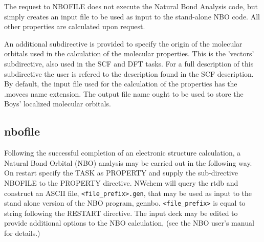 The request to NBOFILE does not execute the Natural Bond Analysis
code, but simply creates an input file to be used as input to the
stand-alone NBO code. All other properties are calculated upon
request.

An additional subdirective is provided to specify the origin of the
molecular orbitals used in the calculation of the molecular
properties. This is the 'vectors' subdirective, also used in the
SCF and DFT tasks. For a full description of this subdirective
the user is refered to the description found in the SCF description.
By default, the input file used for the calculation of the properties
has the .movecs name extension. The output file name ought to be
used to store the Boys' localized molecular orbitals.

\subsection{nbofile}

Following the successful completion of an electronic structure
calculation, a Natural Bond Orbital (NBO) analysis may be carried out
in the following way.  On restart specify the TASK as PROPERTY and
supply the sub-directive NBOFILE to the PROPERTY directive.  NWchem
will query the rtdb and construct an ASCII file,
\verb+<file_prefix>.gen+, that may be used as input to the stand alone
version of the NBO program, gennbo.  \verb+<file_prefix>+ is equal to
string following the RESTART directive.  The input deck may be edited
to provide additional options to the NBO calculation, (see the NBO
user's manual for details.)

